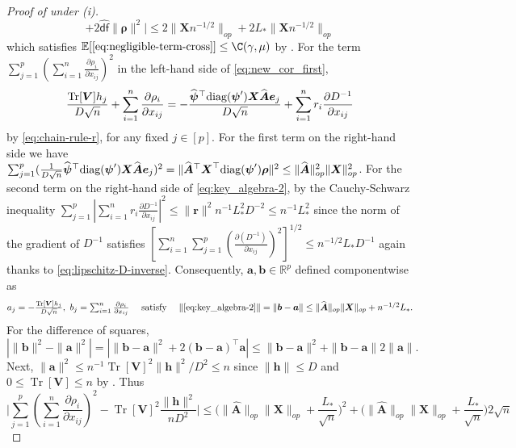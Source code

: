 \documentclass[11pt]{amsart}
\numberwithin{equation}{section}
\numberwithin{equation}{section}
\def\real{{\mathbb{R}}}
\def\R{{\real}}
\def\E{{\mathbb{E}}}
\def\diag{\hbox{\rm diag}}
\DeclareMathOperator{\trace}{Tr}
\def\mathbold{\boldsymbol} %
\def\ba{\mathbold{a}}\def\bfa{\mathbold{a}}\def\ahat{\widehat{a}}\def\atil{\widetilde{a}}
\def\bA{\mathbold{A}}\def\calA{{\cal A}}\def\scrA{{\mathscr A}}\def\Ahat{\widehat{A}}\def\Atil{{\widetilde A}}
\def\hbA{{\widehat{\bA}}}\def\tbA{{\widetilde{\bA}}}
\def\bb{\mathbold{b}}\def\bhat{\widehat{b}}\def\btil{\widetilde{b}}
\def\bh{\mathbold{h}}\def\hhat{\widehat{h}}\def\htil{\widetilde{h}}
\def\br{\mathbold{r}}\def\rhat{\widehat{r}}\def\rtil{\widetilde{r}}\def\rbar{{\overline r}}\def\brbar{{\overline \br}}
\def\be{\mathbold{e}}
\def\bV{\mathbold{V}}\def\hbV{{\widehat{\bV}}}\def\tbV{{\widetilde{\bV}}}
\def\bX{\mathbold{X}}\def\hbX{{\widehat{\bX}}}\def\tbX{{\widetilde{\bX}}}\def\bXbar{{\overline \bX}}
\def\brho{\mathbold{\rho}}\def\rhohat{\widehat{\rho}}\def\hrho{\widehat{\rho}}
\def\bpsi{\mathbold{\psi}}\def\psihat{\widehat{\psi}}\def\hpsi{\widehat{\psi}}
\def\hbpsi{{\widehat{\bpsi}}}\def\tbpsi{{\widetilde{\bpsi}}}
\def\df{{\hat{\mathsf{df}}}{}}
\begin{document}
{\begin{proof}[Proof of  under (i)]
\begin{equation}
    +
    2\df \|\brho\|^2
    \Big|
    \le
    2 \|\bX n^{-1/2}\|_{op}
    +
    2 L_* \|\bX n^{-1/2}\|_{op}
    \label{eq:negligible-term-cross}
    \end{equation}
    which satisfies
    $\E[\eqref{eq:negligible-term-cross}]\le \C(\gamma,\mu)$
    by .
    For the term
    $\sum_{j=1}^p(
\sum_{i=1}^n \frac{\partial \rho_i}{\partial x_{ij}} )^2$ in
the left-hand side of \eqref{eq:new_cor_first},
\begin{equation}
\frac{\trace[\bV] h_j}{D \sqrt n} +
\sum_{i=1}^n \frac{\partial \rho_i}{\partial x_{ij}}
= - \frac{ \hbpsi{}^\top\diag(\bpsi')\bX\hbA\be_j}{D \sqrt n}
+ \sum_{i=1}^n r_i \frac{\partial D^{-1}}{\partial x_{ij}} 
\label{eq:key_algebra-2}
\end{equation}
by \eqref{eq:chain-rule-r}, for any fixed $j\in[p]$.
For the first term on the right-hand side we have
$\sum_{j=1}^p
(\frac{1}{D\sqrt n}\hbpsi{}^\top\diag(\bpsi')\bX\hbA\be_j)^2=
\|\hbA{}^\top \bX^\top \diag(\bpsi')\brho\|^2
\le
\|\hbA\|_{op}^2 \|\bX\|_{op}^2$.
For the second term on the right-hand side of \eqref{eq:key_algebra-2}, by the Cauchy-Schwarz inequality
$\sum_{j=1}^p|\sum_{i=1}^n r_i \frac{\partial D^{-1}}{\partial x_{ij}}|^2
\le \|\br\|^2 n^{-1} L_*^2 D^{-2} \le n^{-1} L_*^2$
since the norm of the gradient of $D^{-1}$ satisfies
$[\sum_{i=1}^n\sum_{j=1}^p(\frac{\partial(D^{-1})}{\partial x_{ij}})^2
]^{1/2}
\le
n^{-1/2} L_* D^{-1}$ again thanks to \eqref{eq:lipschitz-D-inverse}.
Consequently, $\ba,\bb\in\R^p$ defined componentwise as
\begin{equation}
\label{eq:a_j-b_j}
\textstyle
a_j = - \tfrac{\trace[\bV]h_j}{D\sqrt n},
~
b_j=
\sum_{i=1}^n \frac{\partial \rho_i}{\partial x_{ij}}
\quad
\text{ satisfy }
\quad
\|\eqref{eq:key_algebra-2}\|
=
\|\bb-\ba\|\le
\|\hbA\|_{op}\|\bX\|_{op} +  n^{-1/2}L_*.
\end{equation}
For the difference of squares,
$|\|\bb\|^2 - \|\ba\|^2|
=
|\|\bb-\ba\|^2 + 2(\bb-\ba)^\top\ba|
\le 
\|\bb-\ba\|^2 + \|\bb-\ba\| 2 \|\ba\|.$
Next, $\|\ba\|^2 \le n^{-1} \trace[\bV]^2 \|\bh\|^2/D^2 \le n$
since $\|\bh\|\le D$ and $0\le\trace[\bV]\le n$
by . Thus
\begin{equation}
\Big|
\sum_{j=1}^p(
\sum_{i=1}^n \frac{\partial \rho_i}{\partial x_{ij}} )^2
-
\trace[\bV]^2 \frac{\|\bh\|^2}{nD^2}
\Big|
\le 
    \bigl(\|\hbA\|_{op}\|\bX\|_{op} + \frac{L_*}{\sqrt n}\bigr)^2
+
\bigl(\|\hbA\|_{op}\|\bX\|_{op} + \frac{L_*}{\sqrt n}\bigr)
2\sqrt n
\label{divergcence-square-to-bound}
\end{equation}

\end{proof}}
\end{document}
